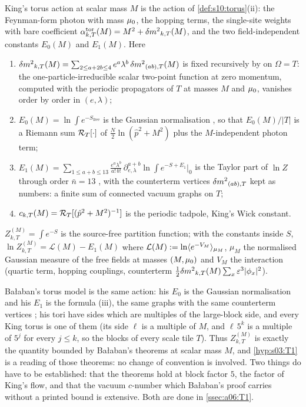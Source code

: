 King's torus action at scalar mass $M$ \cite[(2.4)--(2.9), (3.32)--(3.35)]{K1} is the action of \cref{def:s10:torus}(ii): the Feynman-form photon with mass $\mu_0$, the hopping terms, the single-site weights with bare coefficient $\alpha^{\mathrm{tor}}_{k,T}(M)=M^2+{\delta m^2}_{k,T}(M)$, and the two field-independent constants $E_0(M)$ and $E_1(M)$. Here
\begin{enumerate}[label=\textup{(\roman*)},nosep,leftmargin=*]
\item ${\delta m^2}_{k,T}(M)=\sum_{2\le a+2b\le4}e^a\lambda^b\,{\delta m^2}_{(ab),T}(M)$ is fixed recursively by \cite[(3.33)]{K1} on $\Omega=T$: the one-particle-irreducible scalar two-point function at zero momentum, computed with the periodic propagators of $T$ at masses $M$ and $\mu_0$, vanishes order by order in $(e,\lambda)$;
\item $E_0(M)=\ln\int e^{-S_{\mathrm{free}}}$ is the Gaussian normalisation \cite[(2.6)]{K1}, so that $E_0(M)/|T|$ is a Riemann sum $\mathcal R_{T}[\cdot]$ of $\frac N2\ln(\hat p^2+M^2)$ plus the $M$-independent photon term;
\item $E_1(M)=\sum_{1\le a+b\le13}\frac{e^a\lambda^b}{a!\,b!}\,\partial^{a+b}_{e,\lambda}\ln\!\int e^{-S+E_1}\big|_{0}$ is the Taylor part of $\ln Z$ through order $\bar n=13$ \cite[(3.35)]{K1}, with the counterterm vertices ${\delta m^2}_{(ab),T}$ kept as numbers: a finite sum of connected vacuum graphs on $T$;
\item $c_{k,T}(M)=\mathcal R_{T}[(\hat p^2+M^2)^{-1}]$ is the periodic tadpole, King's Wick constant.
\end{enumerate}
$Z^{(M)}_{k,T}=\int e^{-S}$ is the source-free partition function; with the constants inside $S$, $\ln Z^{(M)}_{k,T}=\mathcal L(M)-E_1(M)$ where $\mathcal L(M):=\ln\langle e^{-V_M}\rangle_{\mu_M}$, $\mu_M$ the normalised Gaussian measure of the free fields at masses $(M,\mu_0)$ and $V_M$ the interaction (quartic term, hopping couplings, counterterm $\frac12{\delta m^2}_{k,T}(M)\sum_x\varepsilon^3|\phi_x|^2$).

Ba{\l}aban's torus model \cite[(1.1)--(1.13)]{Ba1} is the same action: his $E_0$ is the Gaussian normalisation and his $E_1$ \cite[(1.13)]{Ba1} is the formula (iii), the same graphs with the same counterterm vertices \cite[(1.24)]{Ba3}; his tori \cite[(1.2)]{Ba1} have sides which are multiples of the large-block side, and every King torus is one of them (its side $\ell$ is a multiple of $M$, and $\ell\,5^{k}$ is a multiple of $5^{j}$ for every $j\le k$, so the blocks of every scale tile $T$). Thus $Z^{(M)}_{k,T}$ is exactly the quantity bounded by Ba{\l}aban's theorems at scalar mass $M$, and \cref{hyp:s03:T1} is a reading of those theorems: no change of convention is involved. Two things do have to be established: that the theorems hold at block factor $5$, the factor of King's flow, and that the vacuum $c$-number which Ba{\l}aban's proof carries without a printed bound is extensive. Both are done in \cref{ssec:a06:T1}.

